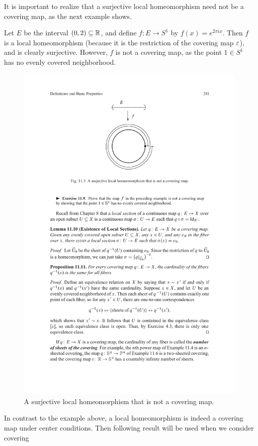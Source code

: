 It is important to realize that a surjective local homeomorphism need not be a
covering map, as the next example shows.
\begin{example}
Let $E$ be the interval $(0,2)\subseteq\mathbb{R}$, and define $f:E\to S^1$ by $f(x)=e^{2\pi ix}$. Then $f$ is 
a local homeomorphism (because it is the restriction of the covering map $\varepsilon$), and is clearly 
surjective. However, $f$ is not a covering map, as the point $1\in S^1$ has no evenly covered neighborhood.
\begin{figure}[htbp]
\centering
\includegraphics{covering-counter}
\caption{A surjective local homeomorphism that is not a covering map.}
\end{figure}
\end{example}
In contrast to the example above, a local homeomorphism is indeed a covering map under center conditions. Then following result will be used when we consider covering 
